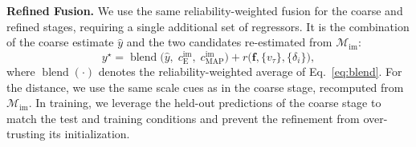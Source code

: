 \noindent\textbf{Refined Fusion.}
We use the same reliability-weighted fusion for the coarse and refined stages, requiring a single additional set of regressors. It is the combination of the coarse estimate $\hat y$ and the two candidates re-estimated from $\mathcal{M}_{\text{im}}$:
\begin{equation}
y^\star=\operatorname{blend}\bigl(\hat y,\;c^{\text{im}}_{\mathrm{E}},\;c^{\text{im}}_{\text{MAP}}\bigr)
+r\bigl(\mathbf{f},\{v_\tau\},\{\delta_i\}\bigr),
\label{eq:refined}
\end{equation}
where $\operatorname{blend}(\cdot)$ denotes the reliability-weighted average of Eq.~\eqref{eq:blend}. For the distance, we use the same scale cues as in the coarse stage, recomputed from $\mathcal{M}_{\text{im}}$. In training, we leverage the held-out predictions of the coarse stage to match the test and training conditions and prevent the refinement from over-trusting its initialization.

